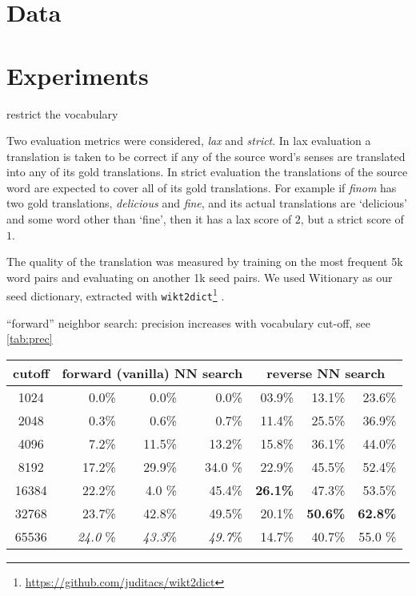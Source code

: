 \documentclass[11pt]{article}
\begin{document}
\section{Data}

\section{Experiments}

restrict the vocabulary

Two evaluation metrics were considered, \emph{lax} and \emph{strict}. In lax
evaluation a translation is taken to be correct if any of the source word's
senses are translated into any of its gold translations.  In strict evaluation
the translations of the source word are expected to cover all of its gold
translations.  For example if {\it finom} has two gold translations, {\it
  delicious} and {\it fine}, and its actual translations are `delicious' and some
word other than `fine', then it has a lax score of $2$, but a strict score
of $1$.

The quality of the translation was measured by training on the most frequent 5k
word pairs and evaluating on another 1k seed pairs.  We used Witionary as our
seed dictionary, extracted with
\texttt{wikt2dict}\footnote{\url{https://github.com/juditacs/wikt2dict}}
\citep{Acs:2016}.

``forward'' neighbor search: precision increases with vocabulary cut-off, see
\cref{tab:prec}

\begin{table*}
  \centering
  \begin{tabular}{c|rrr|rrr}
    \toprule
    cutoff &
    \multicolumn{3}{c|}{forward (vanilla) NN search} &
    \multicolumn{3}{c}{reverse NN search} \\
    \midrule
    1024 & 0.0\% & 0.0\% & 0.0\% & 03.9\% & 13.1\% & 23.6\% \\
    2048 & 0.3\% & 0.6\% & 0.7\% & 11.4\% & 25.5\% & 36.9\% \\
    4096 & 7.2\% & 11.5\% & 13.2\% & 15.8\% & 36.1\% & 44.0\% \\
    8192 & 17.2\% & 29.9\% & 34.0 \%& 22.9\% & 45.5\% & 52.4\% \\
    16384 & 22.2\% & 4.0 \% & 45.4\% & \textbf{26.1\%} & 47.3\% & 53.5\% \\
    32768 & 23.7\% & 42.8\% & 49.5\% & 20.1\% & \textbf{50.6\%} & \textbf{62.8\%} \\
    65536 & \emph{24.0} \%& \emph{43.3}\% & \emph{49.7}\% & 14.7\% & 40.7\% & 55.0 \%\\
    \bottomrule
\end{tabular}
  \caption{Precision of reverse NNs when translating from an AdaGram model
  trained on HNC (600 dimensions, $\alpha=.05$)}
  \label{tab:prec}
\end{table*}
\end{document}
